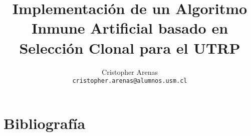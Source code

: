 \documentclass{llncs}
\title{Implementación de un Algoritmo Inmune Artificial basado en Selección Clonal para el UTRP}
\author{Cristopher Arenas\\\texttt{cristopher.arenas@alumnos.usm.cl}}
\institute{Departamento de Informática\\Universidad Técnica Federico Santa María}
\begin{document}
\maketitle













%

\section{Bibliograf\'ia}


\end{document}
